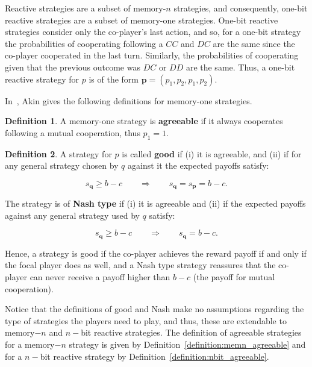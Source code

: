 \documentclass{article}
\theoremstyle{definition}
\newtheorem{definition}{Definition}[section]
\begin{document}
Reactive strategies are a subset of memory-\(n\)
strategies, and consequently, one-bit reactive strategies are a subset of
memory-one strategies. One-bit reactive strategies consider only the co-player's
last action, and so, for a one-bit strategy the probabilities of cooperating
following a \(CC\) and \(DC\) are the same since the co-player cooperated in the
last turn. Similarly, the probabilities of cooperating given that the previous
outcome was \(DC\) or \(DD\) are the same. Thus, a one-bit reactive strategy for \(p\)
is of the form \(\mathbf{p} = (p_1, p_2, p_1, p_2)\).

In~\citep{akin:EGADS:2016}, Akin gives the following definitions for memory-one
strategies.

\begin{definition}
A memory-one strategy is \textbf{agreeable} if it always cooperates following a mutual cooperation,
thus \(p_1=1\).
\end{definition}

\begin{definition}
  A strategy for \(p\) is called \textbf{good} if (i) it is agreeable,
  and (ii) if for any general strategy chosen by \(q\) against it the expected
  payoffs satisfy:
  
  \begin{equation}
    s_{\mathbf{q}} \geq b - c \qquad \Rightarrow \qquad s_{\mathbf{q}} = s_{\mathbf{p}} =  b - c.
  \end{equation}

  The strategy is of \textbf{Nash type} if (i) it is agreeable and (ii) if the
  expected payoffs against any general strategy used by \(q\) satisfy:

  \begin{equation}
    s_{\mathbf{q}} \geq b - c \qquad \Rightarrow \qquad s_{\mathbf{q}} =  b - c.
  \end{equation}
\end{definition}

Hence, a strategy is good if the co-player achieves the reward payoff if and
only if the focal player does as well, and a Nash type strategy reassures that the
co-player can never receive a payoff higher than \(b - c\) (the payoff for mutual
cooperation).

Notice that the definitions of good and Nash make no assumptions regarding the
type of strategies the players need to play, and thus, these are extendable to
memory\(-n\) and \(n-\)bit reactive strategies. The definition of agreeable
strategies for a memory\(-n\)  strategy is given by
Definition~\ref{definition:memn_agreeable} and for a \(n-\)bit reactive
strategy by Definition~\ref{definition:nbit_agreeable}.
\end{document}
